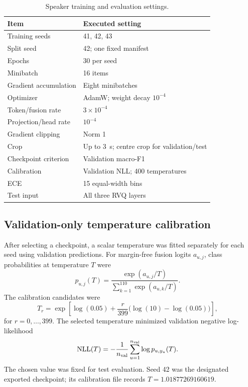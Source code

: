 \begin{table}[t]
\centering
\caption{Speaker training and evaluation settings.}
\label{tab:sv2-speaker-settings}
\small
\begin{tabularx}{\columnwidth}{@{}lY@{}}
\toprule
Item & Executed setting\\
\midrule
Training seeds & 41, 42, 43\\
Split seed & 42; one fixed manifest\\
Epochs & 30 per seed\\
Minibatch & 16 items\\
Gradient accumulation & Eight minibatches\\
Optimizer & AdamW; weight decay $10^{-4}$\\
Token/fusion rate & $3\times10^{-4}$\\
Projection/head rate & $10^{-4}$\\
Gradient clipping & Norm 1\\
Crop & Up to 3~s; centre crop for validation/test\\
Checkpoint criterion & Validation macro-F1\\
Calibration & Validation NLL; 400 temperatures\\
ECE & 15 equal-width bins\\
Test input & All three RVQ layers\\
\bottomrule
\end{tabularx}
\end{table}

\subsection{Validation-only temperature calibration}
After selecting a checkpoint, a scalar temperature was fitted separately for each seed using validation predictions. For margin-free fusion logits $a_{u,j}$, class probabilities at temperature $T$ were
\begin{equation}
 p_{u,j}(T)=
 \frac{\exp(a_{u,j}/T)}
      {\sum_{k=1}^{110}\exp(a_{u,k}/T)}.
 \label{eq:sv2-probability}
\end{equation}
The calibration candidates were
\begin{equation}
 T_r=\exp\left[
 \log(0.05)+\frac{r}{399}\bigl(\log(10)-\log(0.05)\bigr)
 \right],
 \label{eq:sv2-temperature-grid}
\end{equation}
for $r=0,\ldots,399$. The selected temperature minimized validation negative log-likelihood
\begin{equation}
 \mathrm{NLL}(T)
 =-\frac{1}{n_{\rm val}}\sum_{u=1}^{n_{\rm val}}
       \log p_{u,y_u}(T).
 \label{eq:sv2-nll}
\end{equation}
The chosen value was fixed for test evaluation. Seed 42 was the designated exported checkpoint; its calibration file records $T=1.01877269160619$.


